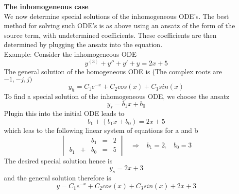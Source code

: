 \textbf{The inhomogeneous case}\\
We now determine special solutions of the inhomogeneous ODE's. The best method for solving such ODE's is as above using an ansatz of the form of the source term, with undetermined coefficients. These coefficients are then determined by plugging the ansatz into the equation.\\
Example: Consider the inhomogeneous ODE
\begin{equation}
  y^{(3)} + y'' + y' + y = 2x + 5
\end{equation}
The general solution of the homogeneous ODE is (The complex roots are $-1, -j, j)$
\begin{equation}
  y_h = C_1 e^{-x} + C_2cos(x) + C_3 sin(x)
\end{equation}
To find a special solution of the inhomogeneous ODE, we choose the ansatz
\begin{equation}
  y_s = b_1x + b_0
\end{equation}
Plugin this into the initial ODE leads to
\begin{equation}
  b_1 + (b_1x + b_0) = 2x + 5
\end{equation}
which leas to the following linear system of equations for a and b
\begin{equation}
  \begin{vmatrix}
        &   & b_1 & = & 2\\
    b_1 & + & b_0 & = & 5
  \end{vmatrix}
  \;\;\; \Rightarrow \;\;\;
  b_1 = 2, \;\;\; b_0 = 3
\end{equation}
The desired special solution hence is
\begin{equation}
  y_s = 2x + 3
\end{equation}
and the general solution therefore is
\begin{equation}
  y = C_1 e^{-x} + C_2cos(x) + C_3 sin(x) + 2x + 3
\end{equation}
